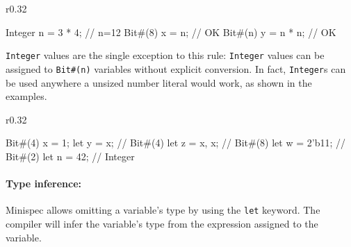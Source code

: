 \begin{wrapfigure}{r}{0.32\columnwidth}
\vspace{-1.8em}
\begin{mscode}
Integer n = 3 * 4;  // n=12
Bit#(8) x = n;      // OK
Bit#(n) y = n * n;  // OK
\end{mscode}
\vspace{-2em}
\end{wrapfigure}

\texttt{Integer} values are the single exception to this rule:
\texttt{Integer} values can be assigned to \texttt{Bit\#(n)} variables without explicit conversion.
In fact, \texttt{Integer}s can be used anywhere a unsized number literal would work,
as shown in the examples.


\begin{wrapfigure}{r}{0.32\columnwidth}
\vspace{-1.5em}
\begin{mscode}
Bit#(4) x = 1;   
let y = x;       // Bit#(4)
let z = {x, x};  // Bit#(8)
let w = 2'b11;   // Bit#(2)
let n = 42;      // Integer
\end{mscode}
\vspace{-3em}
\end{wrapfigure}


\paragraph{Type inference:} Minispec allows omitting a variable's type by using the \texttt{let} keyword.
The compiler will infer the variable's type from the expression assigned to the variable.



